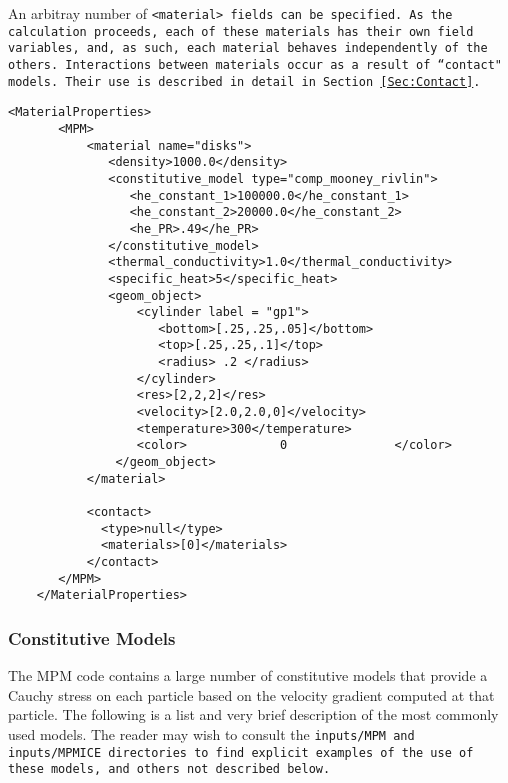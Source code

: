 An arbitray number of \tt <material> \normalfont fields can be specified.
As the calculation proceeds, each of these materials has their own field
variables, and, as such, each material behaves independently of the others.
Interactions between materials occur as a result of ``contact" models.
Their use is described in detail in Section~\ref{Sec:Contact}.

\begin{Verbatim}[fontsize=\footnotesize]
    <MaterialProperties>
       <MPM>
           <material name="disks">
              <density>1000.0</density>
              <constitutive_model type="comp_mooney_rivlin">
                 <he_constant_1>100000.0</he_constant_1>
                 <he_constant_2>20000.0</he_constant_2>
                 <he_PR>.49</he_PR>
              </constitutive_model>
              <thermal_conductivity>1.0</thermal_conductivity>
              <specific_heat>5</specific_heat>
              <geom_object>
                  <cylinder label = "gp1">
                     <bottom>[.25,.25,.05]</bottom>
                     <top>[.25,.25,.1]</top>
                     <radius> .2 </radius>
                  </cylinder>
                  <res>[2,2,2]</res>
                  <velocity>[2.0,2.0,0]</velocity>
                  <temperature>300</temperature>
                  <color>             0               </color>
               </geom_object>
           </material>

           <contact>
             <type>null</type>
             <materials>[0]</materials>
           </contact>
       </MPM>
    </MaterialProperties>
\end{Verbatim}

\subsubsection{Constitutive Models} \label{Sec:ConstitutiveModels}

The MPM code contains a large number of constitutive models that provide
a Cauchy stress on each particle based on the velocity gradient computed at
that particle.  The following is a list and very brief description of 
the most commonly used models.  The reader may wish to consult the
\tt inputs/MPM \normalfont and \tt inputs/MPMICE \normalfont directories
to find explicit examples of the use of these models, and others not
described below.

